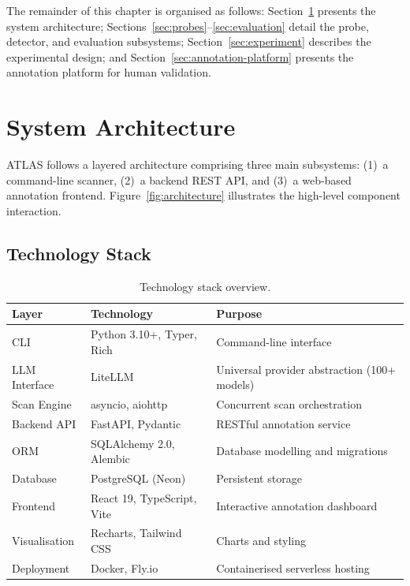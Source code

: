 \documentclass[12pt,a4paper]{report}
\begin{document}
The remainder of this chapter is organised as follows: Section~\ref{sec:architecture} presents the system architecture; Sections~\ref{sec:probes}--\ref{sec:evaluation} detail the probe, detector, and evaluation subsystems; Section~\ref{sec:experiment} describes the experimental design; and Section~\ref{sec:annotation-platform} presents the annotation platform for human validation.

\section{System Architecture}
\label{sec:architecture}

ATLAS follows a layered architecture comprising three main subsystems: (1)~a command-line scanner, (2)~a backend REST API, and (3)~a web-based annotation frontend. Figure~\ref{fig:architecture} illustrates the high-level component interaction.

\subsection{Technology Stack}

\begin{table}[htbp]
\centering
\caption{Technology stack overview.}
\label{tab:tech-stack}
\begin{tabular}{@{}lll@{}}
\toprule
\textbf{Layer} & \textbf{Technology} & \textbf{Purpose} \\
\midrule
CLI & Python 3.10+, Typer, Rich & Command-line interface \\
LLM Interface & LiteLLM & Universal provider abstraction (100+ models) \\
Scan Engine & asyncio, aiohttp & Concurrent scan orchestration \\
Backend API & FastAPI, Pydantic & RESTful annotation service \\
ORM & SQLAlchemy 2.0, Alembic & Database modelling and migrations \\
Database & PostgreSQL (Neon) & Persistent storage \\
Frontend & React 19, TypeScript, Vite & Interactive annotation dashboard \\
Visualisation & Recharts, Tailwind CSS & Charts and styling \\
Deployment & Docker, Fly.io & Containerised serverless hosting \\
\bottomrule
\end{tabular}
\end{table}
\end{document}
